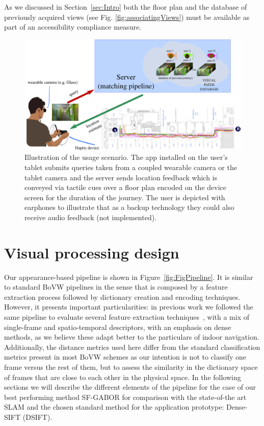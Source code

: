 As we discussed in Section~\ref{sec:Intro} both the floor plan and the database of previously acquired views (see Fig. \ref{fig:associatingViews}) must be available as part of an accessibility compliance measure.


\begin{figure}
\centering
\includegraphics[width=\textwidth]{gfx/Chapter06/overview.png}
\caption{Illustration of the usage scenario. The app installed on the user's tablet submits queries taken from a coupled wearable camera or the tablet camera and the server sends location feedback which is conveyed via tactile cues over a floor plan encoded on the device screen for the duration of the journey. The user is depicted with earphones to illustrate that as a backup technology they could also receive audio feedback (not implemented).}
\label{fig:overview}
\end{figure}

\section{Visual processing design}
\label{sec:visualproc}
Our appearance-based pipeline is shown in Figure~\ref{fig:FigPipeline}. It is similar to standard BoVW pipelines in the sense that is composed by a feature extraction process followed by dictionary creation and encoding techniques. However, it presents important particularities: in previous work we followed the same pipeline to evaluate several feature extraction techniques~\citep{Rivera-Rubio2015PRL}, with a mix of single-frame and spatio-temporal descriptors, with an emphasis on dense methods, as we believe these adapt better to the particulars of indoor navigation. Additionally, the distance metrics used here differ from the standard classification metrics present in most BoVW schemes as our intention is not to classify one frame versus the rest of them, but to assess the similarity in the dictionary space of frames that are close to each other in the physical space. In the following sections we will describe the different elements of the pipeline for the case of our best performing method SF-GABOR for comparison with the state-of-the art SLAM and the chosen standard method for the application prototype: Dense-SIFT (DSIFT).

